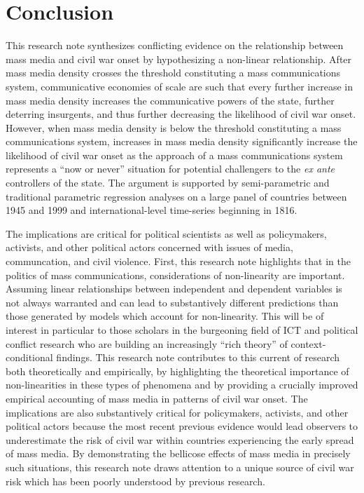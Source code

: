 \documentclass[11pt,article,oneside]{memoir}
\begin{document}
\section{Conclusion}\label{conclusion}

This research note synthesizes conflicting evidence on the relationship
between mass media and civil war onset by hypothesizing a non-linear
relationship. After mass media density crosses the threshold
constituting a mass communications system, communicative economies of
scale are such that every further increase in mass media density
increases the communicative powers of the state, further deterring
insurgents, and thus further decreasing the likelihood of civil war
onset. However, when mass media density is below the threshold
constituting a mass communications system, increases in mass media
density significantly increase the likelihood of civil war onset as the
approach of a mass communications system represents a ``now or never''
situation for potential challengers to the \emph{ex ante} controllers of
the state. The argument is supported by semi-parametric and traditional
parametric regression analyses on a large panel of countries between
1945 and 1999 and international-level time-series beginning in 1816.

The implications are critical for political scientists as well as
policymakers, activists, and other political actors concerned with
issues of media, communcation, and civil violence. First, this research
note highlights that in the politics of mass communications,
considerations of non-linearity are important. Assuming linear
relationships between independent and dependent variables is not always
warranted and can lead to substantively different predictions than those
generated by models which account for non-linearity. This will be of
interest in particular to those scholars in the burgeoning field of ICT
and political conflict research who are building an increasingly ``rich
theory'' of context-conditional findings. This research note contributes
to this current of research both theoretically and empirically, by
highlighting the theoretical importance of non-linearities in these
types of phenomena and by providing a crucially improved empirical
accounting of mass media in patterns of civil war onset. The
implications are also substantively critical for policymakers,
activists, and other political actors because the most recent previous
evidence would lead observers to underestimate the risk of civil war
within countries experiencing the early spread of mass media. By
demonstrating the bellicose effects of mass media in precisely such
situations, this research note draws attention to a unique source of
civil war risk which has been poorly understood by previous research.
\end{document}
